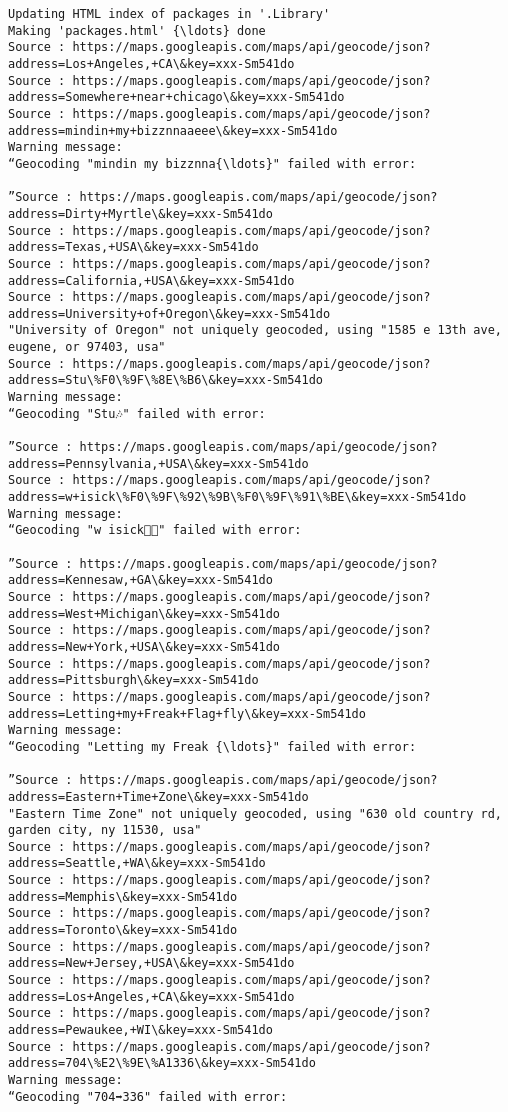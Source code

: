 \documentclass[11pt]{article}
\begin{document}
    \begin{Verbatim}[commandchars=\\\{\}]
Updating HTML index of packages in '.Library'
Making 'packages.html' {\ldots} done
Source : https://maps.googleapis.com/maps/api/geocode/json?address=Los+Angeles,+CA\&key=xxx-Sm541do
Source : https://maps.googleapis.com/maps/api/geocode/json?address=Somewhere+near+chicago\&key=xxx-Sm541do
Source : https://maps.googleapis.com/maps/api/geocode/json?address=mindin+my+bizznnaaeee\&key=xxx-Sm541do
Warning message:
“Geocoding "mindin my bizznna{\ldots}" failed with error:

”Source : https://maps.googleapis.com/maps/api/geocode/json?address=Dirty+Myrtle\&key=xxx-Sm541do
Source : https://maps.googleapis.com/maps/api/geocode/json?address=Texas,+USA\&key=xxx-Sm541do
Source : https://maps.googleapis.com/maps/api/geocode/json?address=California,+USA\&key=xxx-Sm541do
Source : https://maps.googleapis.com/maps/api/geocode/json?address=University+of+Oregon\&key=xxx-Sm541do
"University of Oregon" not uniquely geocoded, using "1585 e 13th ave, eugene, or 97403, usa"
Source : https://maps.googleapis.com/maps/api/geocode/json?address=Stu\%F0\%9F\%8E\%B6\&key=xxx-Sm541do
Warning message:
“Geocoding "Stu🎶" failed with error:

”Source : https://maps.googleapis.com/maps/api/geocode/json?address=Pennsylvania,+USA\&key=xxx-Sm541do
Source : https://maps.googleapis.com/maps/api/geocode/json?address=w+isick\%F0\%9F\%92\%9B\%F0\%9F\%91\%BE\&key=xxx-Sm541do
Warning message:
“Geocoding "w isick💛👾" failed with error:

”Source : https://maps.googleapis.com/maps/api/geocode/json?address=Kennesaw,+GA\&key=xxx-Sm541do
Source : https://maps.googleapis.com/maps/api/geocode/json?address=West+Michigan\&key=xxx-Sm541do
Source : https://maps.googleapis.com/maps/api/geocode/json?address=New+York,+USA\&key=xxx-Sm541do
Source : https://maps.googleapis.com/maps/api/geocode/json?address=Pittsburgh\&key=xxx-Sm541do
Source : https://maps.googleapis.com/maps/api/geocode/json?address=Letting+my+Freak+Flag+fly\&key=xxx-Sm541do
Warning message:
“Geocoding "Letting my Freak {\ldots}" failed with error:

”Source : https://maps.googleapis.com/maps/api/geocode/json?address=Eastern+Time+Zone\&key=xxx-Sm541do
"Eastern Time Zone" not uniquely geocoded, using "630 old country rd, garden city, ny 11530, usa"
Source : https://maps.googleapis.com/maps/api/geocode/json?address=Seattle,+WA\&key=xxx-Sm541do
Source : https://maps.googleapis.com/maps/api/geocode/json?address=Memphis\&key=xxx-Sm541do
Source : https://maps.googleapis.com/maps/api/geocode/json?address=Toronto\&key=xxx-Sm541do
Source : https://maps.googleapis.com/maps/api/geocode/json?address=New+Jersey,+USA\&key=xxx-Sm541do
Source : https://maps.googleapis.com/maps/api/geocode/json?address=Los+Angeles,+CA\&key=xxx-Sm541do
Source : https://maps.googleapis.com/maps/api/geocode/json?address=Pewaukee,+WI\&key=xxx-Sm541do
Source : https://maps.googleapis.com/maps/api/geocode/json?address=704\%E2\%9E\%A1336\&key=xxx-Sm541do
Warning message:
“Geocoding "704➡336" failed with error:


\end{Verbatim}
\end{document}

